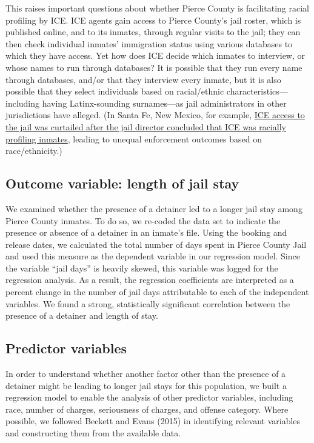 \documentclass[12pt]{report}\usepackage[]{graphicx}\usepackage[]{color}
\begin{document}
This raises important questions about whether Pierce County is facilitating racial profiling by ICE. ICE agents gain access to Pierce County's jail roster, which is published online, and to its inmates, through regular visits to the jail; they can then check individual inmates' immigration status using various databases to which they have access. Yet how does ICE decide which inmates to interview, or whose names to run through databases? It is possible that they run every name through databases, and/or that they interview every inmate, but it is also possible that they select individuals based on racial/ethnic characteristics---including having Latinx-sounding surnames---as jail administrators in other jurisdictions have alleged. (In Santa Fe, New Mexico, for example, \href{https://www.abqjournal.com/news/state/26010444229newsstate05-26-10.htm}{ICE access to the jail was curtailed after the jail director concluded that ICE was racially profiling inmates}, leading to unequal enforcement outcomes based on race/ethnicity.)

\subsection*{Outcome variable: length of jail stay}

We examined whether the presence of a detainer led to a longer jail stay among Pierce County inmates. To do so, we re-coded the data set to indicate the presence or absence of a detainer in an inmate's file. Using the booking and release dates, we calculated the total number of days spent in Pierce County Jail and used this measure as the dependent variable in our regression model. Since the variable ``jail days'' is heavily skewed, this variable was logged for the regression analysis. As a result, the regression coefficients are interpreted as a percent change in the number of jail days attributable to each of the independent variables. We found a strong, statistically significant correlation between the presence of a detainer and length of stay.

\subsection*{Predictor variables}

In order to understand whether another factor other than the presence of a detainer might be leading to longer jail stays for this population, we built a regression model to enable the analysis of other predictor variables, including race, number of charges, seriousness of charges, and offense category. Where possible, we followed Beckett and Evans (2015) in identifying relevant variables and constructing them from the available data.
\end{document}
